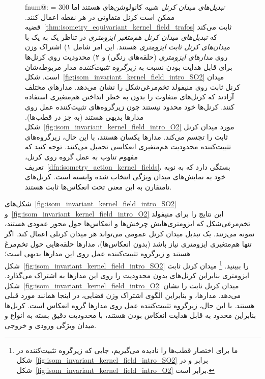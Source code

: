 \begin{figure}
	\makeatletter
	{\protect{}}%
	\small %
	\csname fnum@\@captype\endcsname: %
	\makeatother
	\hyphenpenalty = 300 %
	\emph{تبدیل‌های میدان کرنل} شبیه کانولوشن‌های \lr{$\GM$} هستند اما ممکن است کرنل متفاوتی در هر نقطه اعمال کنند.
	قضیه~\ref{thm:isometry_equivariant_kernel_field_trafos} ثابت می‌کند که \emph{تبدیل‌های میدان کرنل هم‌متغیر ایزومتری} در تناظر یک به یک با \emph{میدان‌های کرنل ثابت ایزومتری} هستند.
	این امر شامل
	۱) اشتراک وزن روی \emph{مدارهای ایزومتری} (حلقه‌های رنگی) و
	۲) محدودیت روی کرنل‌ها برای قابل هدایت بودن نسبت به \emph{زیرگروه تثبیت‌کننده} مدار مربوطه‌شان است.
	شکل~\ref{fig:isom_invariant_kernel_field_intro_SO2} میدان کرنل ثابت  روی منیفولد تخم‌مرغی‌شکل را نشان می‌دهد.
	مدارهای مختلف آزادند که کرنل‌های متفاوت را بدون به خطر انداختن هم‌متغیری  استفاده کنند.
	کرنل‌ها خود محدود نیستند چون زیرگروه‌های تثبیت‌کننده عمل  روی مدارها بدیهی هستند (به جز در قطب‌ها).
	شکل~\ref{fig:isom_invariant_kernel_field_intro_O2} مورد میدان کرنل ثابت  را تجسم می‌کند.
	مدارها یکسان هستند، با این حال، زیرگروه‌های تثبیت‌کننده محدودیت هم‌متغیری انعکاسی تحمیل می‌کنند.
	توجه کنید که مفهوم تناوب به عمل گروه روی کرنل، تعریف~\ref{dfn:isometry_action_kernel_fields}، بستگی دارد که به نوبه خود به نمایش‌های میدان ویژگی انتخاب شده وابسته است.
	کرنل‌های نامتقارن به این معنی تحت انعکاس‌ها ثابت هستند.
	\label{fig:isom_invariant_kernel_field_intro}
\end{figure}


شکل‌های~\ref{fig:isom_invariant_kernel_field_intro_SO2} و~\ref{fig:isom_invariant_kernel_field_intro_O2}
این نتایج را برای منیفولد تخم‌مرغی‌شکل که ایزومتری‌هایش چرخش‌ها و انعکاس‌ها حول محور عمودی هستند، نمونه می‌زنند.
یک تبدیل میدان کرنل عمومی می‌تواند هر میدان کرنلی اعمال کند.
اگر تنها هم‌متغیری ایزومتری  نیاز باشد (بدون انعکاس‌ها)، مدارها حلقه‌هایی حول تخم‌مرغ هستند و زیرگروه تثبیت‌کننده عمل  روی این مدارها بدیهی است؛ شکل~\ref{fig:isom_invariant_kernel_field_intro_SO2} را ببینید.%
\footnote{
	ما برای اختصار قطب‌ها را نادیده می‌گیریم، جایی که زیرگروه تثبیت‌کننده در شکل~\ref{fig:isom_invariant_kernel_field_intro_SO2} برابر  و در شکل~\ref{fig:isom_invariant_kernel_field_intro_O2} برابر  است.
}
میدان کرنل ثابت ایزومتری بنابراین کرنل‌های بدون محدودیت را روی این مدارها به اشتراک می‌گذارد.
شکل~\ref{fig:isom_invariant_kernel_field_intro_O2} میدان کرنل ثابت  را نشان می‌دهد.
مدارها، و بنابراین الگوی اشتراک وزن فضایی، در اینجا همانند مورد قبلی هستند.
با این حال، زیرگروه تثبیت‌کننده عمل  روی مدارها گروه انعکاس است.
کرنل‌ها بنابراین محدود به قابل هدایت انعکاس بودن هستند، با محدودیت دقیق بسته به انواع  و  میدان ویژگی ورودی و خروجی.


